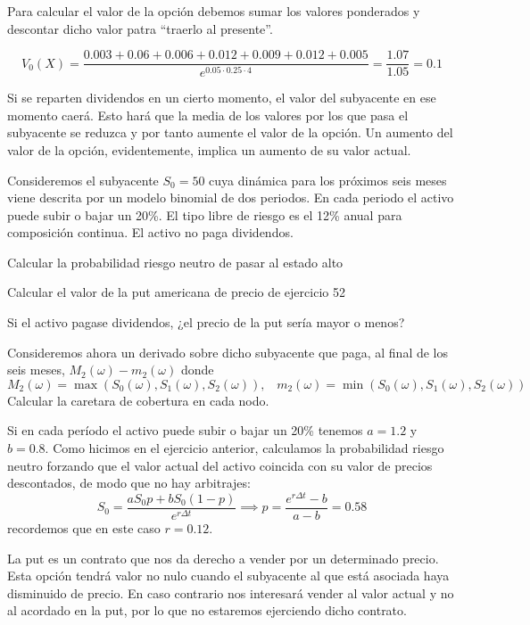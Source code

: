 \begin{problem}[1]
Para calcular el valor de la opción debemos sumar los valores ponderados y descontar dicho valor patra ``traerlo al presente''.

\[V_0(X) = \frac{0.003+0.06+0.006+0.012+0.009+0.012+0.005}{e^{0.05\cdot 0.25\cdot 4}}=\frac{1.07}{1.05}=0.1\]

\spart

Si se reparten dividendos en un cierto momento, el valor del subyacente en ese momento caerá. Esto hará que la media de los valores por los que pasa el subyacente se reduzca y por tanto aumente el valor de la opción. Un aumento del valor de la opción, evidentemente, implica un aumento de su valor actual.
\end{problem}

\begin{problem}[2]
Consideremos el subyacente $S_0=50$ cuya dinámica para los próximos seis meses viene descrita por un modelo binomial de dos periodos. En cada periodo el activo puede subir o bajar un 20\%. El tipo libre de riesgo es el 12\% anual para composición continua. El activo no paga dividendos.

\ppart Calcular la probabilidad riesgo neutro de pasar al estado alto

\ppart Calcular el valor de la put americana de precio de ejercicio 52

\ppart Si el activo pagase dividendos, ¿el precio de la put sería mayor o menos?

\ppart Consideremos ahora un derivado sobre dicho subyacente que paga, al final de los seis meses, $M_2(ω)-m_2(ω)$ donde
\[M_2(ω)=\max(S_0(ω),S_1(ω),S_2(ω)), \;\;\; m_2(ω)=\min(S_0(ω),S_1(ω),S_2(ω))\]
Calcular la caretara de cobertura en cada nodo.

\solution
{}

\spart

Si en cada período el activo puede subir o bajar un 20\% tenemos $a=1.2$ y $b=0.8$. Como hicimos en el ejercicio anterior, calculamos la probabilidad riesgo neutro forzando que el valor actual del activo coincida con su valor de precios descontados, de modo que no hay arbitrajes:
\[S_0 = \frac{aS_0p + bS_0(1-p)}{e^{rΔt}} \implies p = \frac{e^{rΔt}-b}{a-b} = 0.58\]
recordemos que en este caso $r=0.12$.

\spart

La put es un contrato que nos da derecho a vender por un determinado precio. Esta opción tendrá valor no nulo cuando el subyacente al que está asociada haya disminuido de precio. En caso contrario nos interesará vender al valor actual y no al acordado en la put, por lo que no estaremos ejerciendo dicho contrato.


\end{problem}
